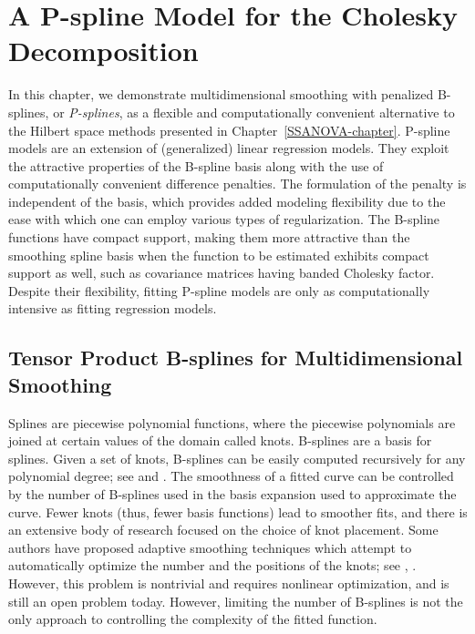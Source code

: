 
\chapter{A P-spline Model for the Cholesky Decomposition} \label{psplines-chapter}



In this chapter, we demonstrate multidimensional smoothing with penalized B-splines, or \textit{P-splines}, as a flexible and computationally convenient alternative to the Hilbert space methods presented in Chapter~\ref{SSANOVA-chapter}. P-spline models are an extension of (generalized) linear regression models. They exploit the attractive properties of the B-spline basis along with the use of computationally convenient difference penalties. The formulation of the penalty is independent of the basis, which provides added modeling flexibility due to the ease with which one can employ various types of regularization. The B-spline functions have compact support, making them more attractive than the smoothing spline basis when the function to be estimated exhibits compact support as well, such as covariance matrices having banded Cholesky factor. Despite their flexibility, fitting P-spline models are only as computationally intensive as fitting regression models.  

\section{Tensor Product B-splines for Multidimensional Smoothing}

Splines are piecewise polynomial functions, where the piecewise polynomials are joined at certain values of the domain called knots. B-splines are a basis for splines. Given a set of knots, B-splines can be easily computed recursively for any polynomial degree; see \cite{de1978practical} and \cite{dierckx1995curve}. The smoothness of a fitted curve can be controlled by the number of B-splines used in the basis expansion used to approximate the curve. Fewer knots (thus, fewer basis functions) lead to smoother fits, and there is an extensive body of research focused on the choice of knot placement. Some authors have proposed adaptive smoothing techniques which attempt to automatically optimize the number and the positions of the knots; see \cite{friedman1989flexible}, \cite{kooperberg1991study}. However, this problem is nontrivial and requires nonlinear optimization, and is still an open problem today. However, limiting the number of B-splines is not the only approach to controlling the complexity of the fitted function.

